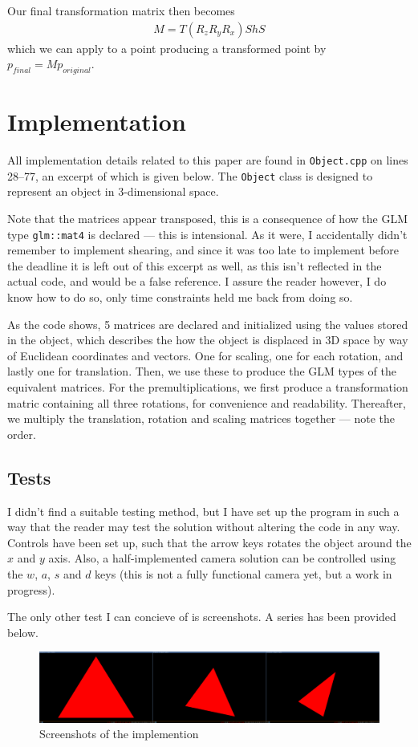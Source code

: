 \documentclass[11pt]{article}
\newcommand{\code}[1]{{\tt #1}}
\newcommand{\file}[1]{{\tt #1}}
\begin{document}
Our final transformation matrix then becomes
\begin{align}
    M = T (R_z R_y R_x) Sh S
\end{align}
which we can apply to a point producing a transformed point by $p_{final} =
M p_{original}$.

\section{Implementation}
All implementation details related to this paper are found in
\file{Object.cpp} on lines 28--77, an excerpt of which is given below. The
\code{Object} class is designed to represent an object in 3-dimensional space.

Note that the matrices appear transposed, this is a consequence of how the
GLM type \code{glm::mat4} is declared --- this is intensional. As it were, I
accidentally didn't remember to implement shearing, and since it was too late
to implement before the deadline it is left out of this excerpt as well, as
this isn't reflected in the actual code, and would be a false reference. I
assure the reader however, I do know how to do so, only time constraints held
me back from doing so.

As the code shows, 5 matrices are declared and initialized using the values
stored in the object, which describes the how the object is displaced in 3D
space by way of Euclidean coordinates and vectors. One for scaling, one for
each rotation, and lastly one for translation. Then, we use these to produce
the GLM types of the equivalent matrices. For the premultiplications, we first
produce a transformation matric containing all three rotations, for
convenience and readability. Thereafter, we multiply the translation, rotation
and scaling matrices together --- note the order.

\subsection{Tests}
I didn't find a suitable testing method, but I have set up the program in such
a way that the reader may test the solution without altering the code in any
way. Controls have been set up, such that the arrow keys rotates the object
around the $x$ and $y$ axis. Also, a half-implemented camera solution can be
controlled using the $w$, $a$, $s$ and $d$ keys (this is not a fully
functional camera yet, but a work in progress).

The only other test I can concieve of is screenshots. A series has been
provided below.
\begin{figure}[H]
    \center
    \includegraphics[scale=0.27]{figures/test.jpg}
    \caption{Screenshots of the implemention}
\end{figure}
\end{document}

